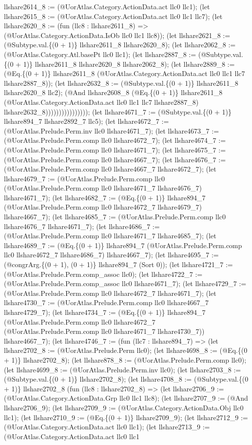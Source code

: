\documentclass[11pt]{article}
\begin{document}
llshare2614\_8 := (@UorAtlas.Category.ActionData.act llc0 llc1); (let llshare2615\_8 := (@UorAtlas.Category.ActionData.act llc0 llc1 llc7); (let llshare2620\_8 := (fun (llc8 : llshare2611\_8) => (@UorAtlas.Category.ActionData.IsOb llc0 llc1 llc8)); (let llshare2621\_8 := (@Subtype.val.\{(0 + 1)\} llshare2611\_8 llshare2620\_8); (let llshare2062\_8 := (@UorAtlas.Category.Atl.basePt llc0 llc1); (let llshare2887\_8 := (@Subtype.val.\{(0 + 1)\} llshare2611\_8 llshare2620\_8 llshare2062\_8); (let llshare2889\_8 := (@Eq.\{(0 + 1)\} llshare2611\_8 (@UorAtlas.Category.ActionData.act llc0 llc1 llc7 llshare2887\_8)); (let llshare2632\_8 := (@Subtype.val.\{(0 + 1)\} llshare2611\_8 llshare2620\_8 llc2); (@And llshare2608\_8 (@Eq.\{(0 + 1)\} llshare2611\_8 (@UorAtlas.Category.ActionData.act llc0 llc1 llc7 llshare2887\_8) llshare2632\_8)))))))))))))))); (let llshare4671\_7 := (@Subtype.val.\{(0 + 1)\} llshare894\_7 llshare2892\_7 llc5); (let llshare4672\_7 := (@UorAtlas.Prelude.Perm.inv llc0 llshare4671\_7); (let llshare4673\_7 := (@UorAtlas.Prelude.Perm.comp llc0 llshare4672\_7); (let llshare4674\_7 := (@UorAtlas.Prelude.Perm.comp llc0 llshare4671\_7); (let llshare4675\_7 := (@UorAtlas.Prelude.Perm.comp llc0 llshare4667\_7); (let llshare4676\_7 := (@UorAtlas.Prelude.Perm.comp llc0 llshare4667\_7 llshare4672\_7); (let llshare4679\_7 := (@UorAtlas.Prelude.Perm.comp llc0 (@UorAtlas.Prelude.Perm.comp llc0 llshare4671\_7 llshare4676\_7) llshare4671\_7); (let llshare4682\_7 := (@Eq.\{(0 + 1)\} llshare894\_7 (@UorAtlas.Prelude.Perm.comp llc0 llshare4672\_7 llshare4679\_7) llshare4667\_7); (let llshare4685\_7 := (@UorAtlas.Prelude.Perm.comp llc0 llshare4676\_7 llshare4671\_7); (let llshare4686\_7 := (@UorAtlas.Prelude.Perm.comp llc0 llshare4671\_7 llshare4685\_7); (let llshare4689\_7 := (@Eq.\{(0 + 1)\} llshare894\_7 (@UorAtlas.Prelude.Perm.comp llc0 llshare4672\_7 llshare4686\_7) llshare4667\_7); (let llshare4695\_7 := (@congrArg.\{(0 + 1), (0 + 1)\} llshare894\_7 (Sort 0)); (let llshare4721\_7 := (@UorAtlas.Prelude.Perm.comp\_assoc llc0); (let llshare4722\_7 := (@UorAtlas.Prelude.Perm.comp\_assoc llc0 llshare4671\_7); (let llshare4729\_7 := (@UorAtlas.Prelude.Perm.comp llc0 llshare4672\_7 llshare4671\_7); (let llshare4730\_7 := (@UorAtlas.Prelude.Perm.comp llc0 llshare4667\_7 llshare4729\_7); (let llshare4734\_7 := (@Eq.\{(0 + 1)\} llshare894\_7 (@UorAtlas.Prelude.Perm.comp llc0 llshare4672\_7 (@UorAtlas.Prelude.Perm.comp llc0 llshare4671\_7 llshare4730\_7)) llshare4667\_7); (let llshare4746\_7 := (fun (llc7 : llshare894\_7) => (let llshare2702\_8 := (@UorAtlas.Prelude.Perm llc0); (let llshare4698\_8 := (@Eq.\{(0 + 1)\} llshare2702\_8); (let llshare878\_8 := (@UorAtlas.Prelude.Perm.comp llc0); (let llshare4699\_8 := (@UorAtlas.Prelude.Perm.inv llc0); (let llshare2703\_8 := (@Subtype.val.\{(0 + 1)\} llshare2702\_8); (let llshare4708\_8 := (@Subtype.val.\{(0 + 1)\} llshare2702\_8 (fun (llc8 : llshare2702\_8) => (let llshare2706\_9 := (@UorAtlas.Category.ActionData.Grp llc0 llc1 llc8); (let llshare2707\_9 := (@And llshare2706\_9); (let llshare2709\_9 := (@UorAtlas.Category.ActionData.Obj llc0 llc1); (let llshare2710\_9 := (@Eq.\{(0 + 1)\} llshare2709\_9); (let llshare2712\_9 := (@UorAtlas.Category.ActionData.act llc0 llc1); (let llshare2713\_9 := (@UorAtlas.Category.ActionData.act llc0 llc1 
\end{document}
